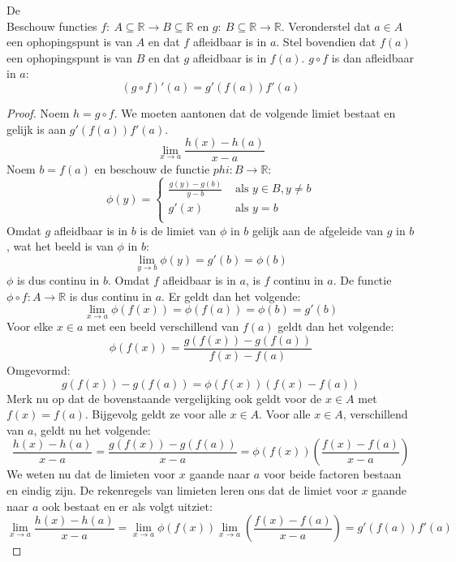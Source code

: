 \documentclass[main.tex]{subfiles}
\begin{document}
\begin{bst}
  \label{st:kettingregel}
  De \\
  Beschouw functies $f:\ A \subseteq \mathbb{R} \rightarrow B \subseteq \mathbb{R}$ en $g:\ B \subseteq \mathbb{R} \rightarrow \mathbb{R}$.
  Veronderstel dat $a\in A$ een ophopingspunt is van $A$ en dat $f$ afleidbaar is in $a$.
  Stel bovendien dat $f(a)$ een ophopingspunt is van $B$ en dat $g$ afleidbaar is in $f(a)$.
  $g\circ f$ is dan afleidbaar in $a$:
  \[ (g \circ f)'(a) = g'(f(a))f'(a) \]

  \begin{proof}
    Noem $h=g\circ f$.
    We moeten aantonen dat de volgende limiet bestaat en gelijk is aan $g'(f(a))f'(a)$.
    \[ \lim_{x\rightarrow a}\frac{h(x)-h(a)}{x-a} \]
    Noem $b=f(a)$ en beschouw de functie $phi: B \rightarrow \mathbb{R}$:
    \[
    \phi(y) =
    \left\{
      \begin{array}{cl}
        \frac{g(y)-g(b)}{y-b} & \text{ als } y\in B, y \neq b\\
        g'(x) &\text{ als } y=b\\
      \end{array}
    \right.
    \]
    Omdat $g$ afleidbaar is in $b$ is de limiet van $\phi$ in $b$ gelijk aan de afgeleide van $g$ in $b$, wat het beeld is van $\phi$ in $b$:
    \[ \lim_{y\rightarrow b}\phi(y) = g'(b) = \phi(b) \]
    $\phi$ is dus continu in $b$.
    Omdat $f$ afleidbaar is in $a$, is $f$ continu in $a$.
    De functie $\phi \circ f: A \rightarrow \mathbb{R}$ is dus continu in $a$.
    Er geldt dan het volgende:
    \[ \lim_{x\rightarrow a}\phi(f(x)) = \phi(f(a)) = \phi(b) = g'(b) \]
    Voor elke $x\in a$ met een beeld verschillend van $f(a)$ geldt dan het volgende:
    \[ \phi(f(x)) = \frac{g(f(x)) - g(f(a))}{f(x)-f(a)} \]
    Omgevormd:
    \[ g(f(x)) - g(f(a)) = \phi(f(x))(f(x)-f(a)) \]
    Merk nu op dat de bovenstaande vergelijking ook geldt voor de $x\in A$ met $f(x)=f(a)$.
    Bijgevolg geldt ze voor alle $x\in A$.
    Voor alle $x\in A$, verschillend van $a$, geldt nu het volgende:
    \[ 
    \frac{h(x)-h(a)}{x-a} = \frac{g(f(x))-g(f(a))}{x-a}  = \phi(f(x))\left(\frac{f(x)-f(a)}{x-a}\right)
    \]
    We weten nu dat de limieten voor $x$ gaande naar $a$ voor beide factoren bestaan en eindig zijn.\waarom
    De rekenregels van limieten leren ons dat de limiet voor $x$ gaande naar $a$ ook bestaat en er als volgt uitziet:
    \[ \lim_{x\rightarrow a}\frac{h(x)-h(a)}{x-a} = \lim_{x\rightarrow a}\phi(f(x))\lim_{x\rightarrow a}\left(\frac{f(x)-f(a)}{x-a}\right) = g'(f(a))f'(a) \]
  \end{proof}
\end{bst}
\end{document}
